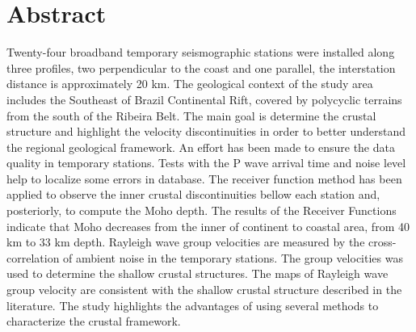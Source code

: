 \chapter*{Abstract}

Twenty-four broadband temporary seismographic stations were installed along three profiles, two perpendicular to the coast and one parallel, the interstation distance is approximately 20 km. The geological context of the study area includes the Southeast of Brazil Continental Rift, covered by polycyclic terrains from the south of the Ribeira Belt. The main goal is determine the crustal structure and highlight the velocity discontinuities in order to better understand the regional geological framework. An effort has been made to ensure the data quality in temporary stations. Tests with the P wave arrival time and noise level help to localize some errors in database. The receiver function method has been applied to observe the inner crustal discontinuities bellow each station and, posteriorly, to compute the Moho depth. The results of the Receiver Functions indicate that Moho decreases from the inner of continent to coastal area, from 40 km to 33 km depth. Rayleigh wave group velocities are measured by the cross-correlation of ambient noise in the temporary stations. The group velocities was used to determine the shallow crustal structures. The maps of Rayleigh wave group velocity are consistent with the shallow crustal structure described in the literature. The study highlights the advantages of using several methods to characterize the crustal framework. 